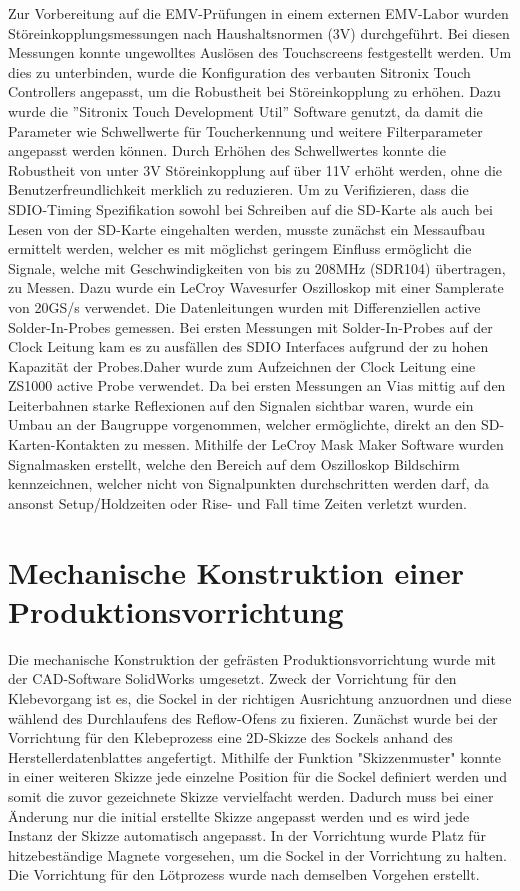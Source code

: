 \documentclass[praktikum,german]{hgbthesis}
\begin{document}
Zur Vorbereitung auf die EMV-Prüfungen in einem externen EMV-Labor wurden Störeinkopplungsmessungen nach Haushaltsnormen (3V) durchgeführt. Bei diesen Messungen konnte ungewolltes Auslösen des Touchscreens festgestellt werden. Um dies zu unterbinden, wurde die Konfiguration des verbauten Sitronix Touch Controllers angepasst, um die Robustheit bei Störeinkopplung zu erhöhen. Dazu wurde die ''Sitronix Touch Development Util'' Software genutzt, da damit die Parameter wie Schwellwerte für Toucherkennung und weitere Filterparameter angepasst werden können. Durch Erhöhen des Schwellwertes konnte die Robustheit von unter 3V Störeinkopplung auf über 11V erhöht werden, ohne die Benutzerfreundlichkeit merklich zu reduzieren.
Um zu Verifizieren, dass die SDIO-Timing Spezifikation sowohl bei Schreiben auf die SD-Karte als auch bei Lesen von der SD-Karte eingehalten werden, musste zunächst ein Messaufbau ermittelt werden, welcher es mit möglichst geringem Einfluss ermöglicht die Signale, welche mit Geschwindigkeiten von bis zu 208MHz (SDR104) übertragen, zu Messen. Dazu wurde ein LeCroy Wavesurfer Oszilloskop mit einer Samplerate von 20GS/s verwendet. Die Datenleitungen wurden mit Differenziellen active Solder-In-Probes gemessen. Bei ersten Messungen mit Solder-In-Probes auf der Clock Leitung kam es zu ausfällen des SDIO Interfaces aufgrund der zu hohen Kapazität der Probes.Daher wurde zum Aufzeichnen der Clock Leitung eine ZS1000 active Probe verwendet. Da bei ersten Messungen an Vias mittig auf den Leiterbahnen starke Reflexionen auf den Signalen sichtbar waren, wurde ein Umbau an der Baugruppe vorgenommen, welcher ermöglichte, direkt an den SD-Karten-Kontakten zu messen.
Mithilfe der LeCroy Mask Maker Software wurden Signalmasken erstellt, welche den Bereich auf dem Oszilloskop Bildschirm kennzeichnen, welcher nicht von Signalpunkten durchschritten werden darf, da ansonst Setup/Holdzeiten oder Rise- und Fall time Zeiten verletzt wurden.

\section{Mechanische Konstruktion einer Produktionsvorrichtung}
Die mechanische Konstruktion der gefrästen Produktionsvorrichtung wurde mit der CAD-Software SolidWorks umgesetzt. Zweck der Vorrichtung für den Klebevorgang ist es, die Sockel in der richtigen Ausrichtung anzuordnen und diese wählend des Durchlaufens des Reflow-Ofens zu fixieren. Zunächst wurde bei der Vorrichtung für den Klebeprozess eine 2D-Skizze des Sockels anhand des Herstellerdatenblattes angefertigt. Mithilfe der Funktion "Skizzenmuster" konnte in einer weiteren Skizze jede einzelne Position für die Sockel definiert werden und somit die zuvor gezeichnete Skizze vervielfacht werden. Dadurch muss bei einer Änderung nur die initial erstellte Skizze angepasst werden und es wird jede Instanz der Skizze automatisch angepasst. In der Vorrichtung wurde Platz für hitzebeständige Magnete vorgesehen, um die Sockel in der Vorrichtung zu halten. Die Vorrichtung für den Lötprozess wurde nach demselben Vorgehen erstellt.
\end{document}
